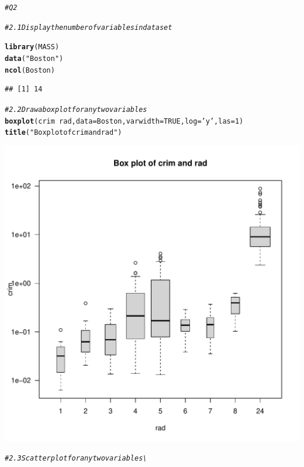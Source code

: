 \documentclass{article}\usepackage[]{graphicx}\usepackage[]{xcolor}
\makeatletter
\def\maxwidth{ %
  \ifdim\Gin@nat@width>\linewidth
    \linewidth
  \else
    \Gin@nat@width
  \fi
}
\newcommand{\hlnum}[1]{\textcolor[rgb]{0.686,0.059,0.569}{#1}}%
\newcommand{\hlsng}[1]{\textcolor[rgb]{0.192,0.494,0.8}{#1}}%
\newcommand{\hlcom}[1]{\textcolor[rgb]{0.678,0.584,0.686}{\textit{#1}}}%
\newcommand{\hlopt}[1]{\textcolor[rgb]{0,0,0}{#1}}%
\newcommand{\hldef}[1]{\textcolor[rgb]{0.345,0.345,0.345}{#1}}%
\newcommand{\hlkwc}[1]{\textcolor[rgb]{0.333,0.667,0.333}{#1}}%
\newcommand{\hlkwd}[1]{\textcolor[rgb]{0.737,0.353,0.396}{\textbf{#1}}}%
\newenvironment{kframe}{%
 \def\at@end@of@kframe{}%
 \ifinner\ifhmode%
  \def\at@end@of@kframe{\end{minipage}}%
  \begin{minipage}{\columnwidth}%
 \fi\fi%
 \def\FrameCommand##1{\hskip\@totalleftmargin \hskip-\fboxsep
 \colorbox{shadecolor}{##1}\hskip-\fboxsep
     \hskip-\linewidth \hskip-\@totalleftmargin \hskip\columnwidth}%
 \MakeFramed {\advance\hsize-\width
   \@totalleftmargin\z@ \linewidth\hsize
   \@setminipage}}%
 {\par\unskip\endMakeFramed%
 \at@end@of@kframe}
\newenvironment{knitrout}{}{} %
\makeatother
\begin{document}
\begin{knitrout}
\color{fgcolor}\begin{kframe}
\begin{alltt}
\hlcom{# Q2}

\hlcom{# 2.1 Display the number of variables in dataset}

\hlkwd{library}\hldef{(MASS)}
\hlkwd{data}\hldef{(}\hlsng{"Boston"}\hldef{)}
\hlkwd{ncol}\hldef{(Boston)}
\end{alltt}
\begin{verbatim}
## [1] 14
\end{verbatim}
\begin{alltt}
\hlcom{# 2.2 Draw a box plot for any two variables}
\hlkwd{boxplot}\hldef{(crim} \hlopt{~} \hldef{rad,}\hlkwc{data}\hldef{=Boston,} \hlkwc{varwidth} \hldef{=} \hlnum{TRUE}\hldef{,} \hlkwc{log}\hldef{=}\hlsng{'y'}\hldef{,} \hlkwc{las} \hldef{=} \hlnum{1}\hldef{)}
\hlkwd{title}\hldef{(}\hlsng{"Box plot of crim and rad"}\hldef{)}
\end{alltt}
\end{kframe}
\includegraphics[width=\maxwidth]{figure/unnamed-chunk-2-1} 
\begin{kframe}\begin{alltt}
\hlcom{# 2.3 Scatterplot for any two variables\textbackslash{}}

\end{alltt}
\end{kframe}
\end{knitrout}
\end{document}
